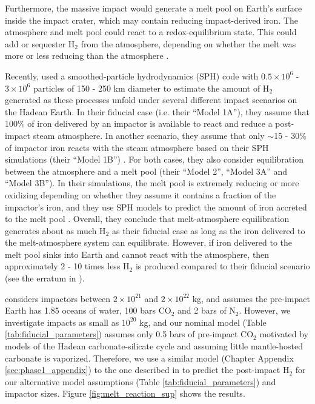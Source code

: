 Furthermore, the massive impact would generate a melt pool on Earth's surface inside the impact crater, which may contain reducing impact-derived iron. The atmosphere and melt pool could react to a redox-equilibrium state. This could add or sequester H$_2$ from the atmosphere, depending on whether the melt was more or less reducing than the atmosphere \citep{Itcovitz_2022}.

Recently, \citet{Itcovitz_2022} used a smoothed-particle hydrodynamics (SPH) code with $0.5 \times 10^6$ - $3 \times 10^6$ particles of 150 - 250 km diameter to estimate the amount of H$_2$ generated as these processes unfold under several different impact scenarios on the Hadean Earth. In their fiducial case (i.e. their ``Model 1A''), they assume that 100\% of iron delivered by an impactor is available to react and reduce a post-impact steam atmosphere. In another scenario, they assume that only $\sim$15 - 30\% of impactor iron reacts with the steam atmosphere based on their SPH simulations (their ``Model 1B'') \citep{Citron_2022}. For both cases, they also consider equilibration between the atmosphere and a melt pool (their ``Model 2'', ``Model 3A'' and ``Model 3B''). In their simulations, the melt pool is extremely reducing or more oxidizing depending on whether they assume it contains a fraction of the impactor's iron, and they use SPH models to predict the amount of iron accreted to the melt pool \citep{Citron_2022}. Overall, they conclude that melt-atmosphere equilibration generates about as much H$_2$ as their fiducial case as long as the iron delivered to the melt-atmosphere system can equilibrate. However, if iron delivered to the melt pool sinks into Earth and cannot react with the atmosphere, then approximately 2 - 10 times less H$_2$ is produced compared to their fiducial scenario (see the erratum in \citet{Itcovitz_2022}).

\citet{Itcovitz_2022} considers impactors between $2 \times 10^{21}$ and $2 \times 10^{22}$ kg, and assumes the pre-impact Earth has 1.85 oceans of water, 100 bars CO$_2$ and 2 bars of N$_2$. However, we investigate impacts as small as $10^{20}$ kg, and our nominal model (Table \ref{tab:fiducial_parameters}) assumes only 0.5 bars of pre-impact CO$_2$ motivated by models of the Hadean carbonate-silicate cycle \citep{Kadoya_2020} and assuming little mantle-hosted carbonate is vaporized. Therefore, we use a similar model (Chapter Appendix \ref{sec:phase1_appendix}) to the one described in \citet{Itcovitz_2022} to predict the post-impact H$_2$ for our alternative model assumptions (Table \ref{tab:fiducial_parameters}) and impactor sizes. Figure \ref{fig:melt_reaction_sup} shows the results.

